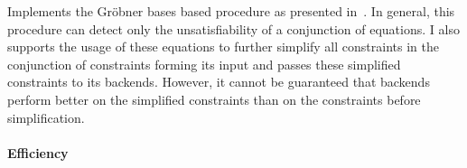Implements the Gr\"obner bases based procedure as presented in~\cite{JLCA_CAI13}. In general, this procedure can detect only the unsatisfiability of a conjunction of equations. I also supports the usage of these equations to further simplify all constraints in the conjunction of constraints forming its input and passes these simplified constraints to its backends. However, it cannot be guaranteed that backends perform better on the simplified constraints than on the constraints before simplification.

\paragraph{Efficiency} 